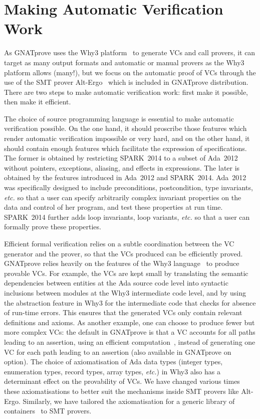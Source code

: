 \documentclass[sttt,draft]{svjour}
\newcommand{\gnatprove}{GNATprove\xspace}
\newcommand{\newspark}{SPARK~2014\xspace}
\newcommand{\adatwtw}{Ada~2012\xspace}
\newcommand{\etc}{\textit{etc.}\xspace}
\begin{document}
\section{Making Automatic Verification Work}
\label{automation}

As \gnatprove uses the Why3 platform~\cite{why3} to generate VCs and call
provers, it can target as many output formats and automatic or manual provers
as the Why3 platform allows (many!), but we focus on the automatic proof of VCs
through the use of the SMT prover Alt-Ergo~\cite{altergo} which is included in
\gnatprove distribution. There are two steps to make automatic verification
work: first make it possible, then make it efficient.

The choice of source programming language is essential to make automatic
verification possible. On the one hand, it should proscribe those features
which render automatic verification impossible or very hard, and on the other
hand, it should contain enough features which facilitate the expression of
specifications. The former is obtained by restricting \newspark to a subset of
\adatwtw without pointers, exceptions, aliasing, and effects in
expressions. The later is obtained by the features introduced in \adatwtw and
\newspark. \adatwtw was specifically designed to include preconditions,
postcondition, type invariants, \etc so that a user can specify arbitrarily
complex invariant properties on the data and control of her program, and test
these properties at run time. \newspark further adds loop invariants, loop
variants, \etc so that a user can formally prove these properties.

Efficient formal verification relies on a subtle coordination between the VC
generator and the prover, so that the VCs produced can be efficiently
proved. \gnatprove relies heavily on the features of the Why3
language~\cite{guitton2011boogie} to produce provable VCs. For example, the VCs
are kept small by translating the semantic dependencies between entities at the
Ada source code level into syntactic inclusions between modules at the Why3
intermediate code level, and by using the abstraction feature in Why3 for the
intermediate code that checks for absence of run-time errors. This ensures that
the generated VCs only contain relevant definitions and axioms. As another
example, one can choose to produce fewer but more complex VCs: the default in
\gnatprove is that a VC accounts for all paths leading to an assertion, using
an efficient computation~\cite{leino2005ipl}, instead of generating one VC for
each path leading to an assertion (also available in \gnatprove on option). The
choice of axiomatisation of Ada data types (integer types, enumeration types,
record types, array types, \etc) in Why3 also has a determinant effect on the
provability of VCs. We have changed various times these axiomatisations to
better suit the mechanisms inside SMT provers like Alt-Ergo. Similarly, we have
tailored the axiomatisation for a generic library of
containers~\cite{dross:2011:tap} to SMT provers.
\end{document}
